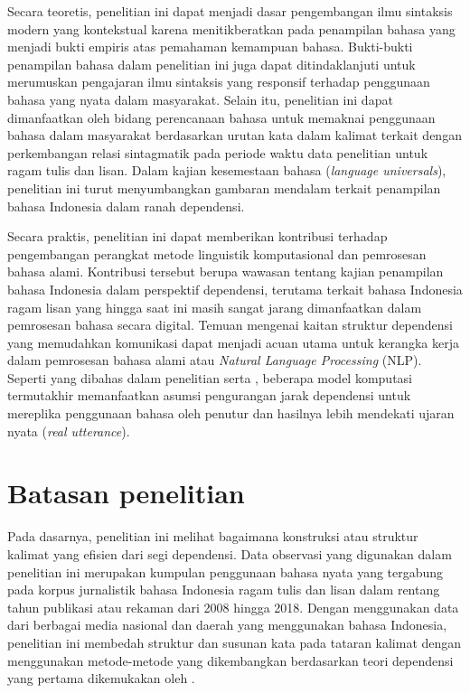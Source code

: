 Secara teoretis, penelitian ini dapat menjadi dasar pengembangan ilmu sintaksis modern yang kontekstual karena menitikberatkan pada penampilan bahasa yang menjadi bukti empiris atas pemahaman kemampuan bahasa. Bukti-bukti penampilan bahasa dalam penelitian ini juga dapat ditindaklanjuti untuk merumuskan pengajaran ilmu sintaksis yang responsif terhadap penggunaan bahasa yang nyata dalam masyarakat. Selain itu, penelitian ini dapat dimanfaatkan oleh bidang perencanaan bahasa untuk memaknai penggunaan bahasa dalam masyarakat berdasarkan urutan kata dalam kalimat terkait dengan perkembangan relasi sintagmatik pada periode waktu data penelitian untuk ragam tulis dan lisan. Dalam kajian kesemestaan bahasa (\textit{language universals}), penelitian ini turut menyumbangkan gambaran mendalam terkait penampilan bahasa Indonesia dalam ranah dependensi.

Secara praktis, penelitian ini dapat memberikan kontribusi terhadap pengembangan perangkat metode linguistik komputasional dan pemrosesan bahasa alami. Kontribusi tersebut berupa wawasan tentang kajian penampilan bahasa Indonesia dalam perspektif dependensi, terutama terkait bahasa Indonesia ragam lisan yang hingga saat ini masih sangat jarang dimanfaatkan dalam pemrosesan bahasa secara digital. Temuan mengenai kaitan struktur dependensi yang memudahkan komunikasi dapat menjadi acuan utama untuk kerangka kerja dalam pemrosesan bahasa alami atau \textit{Natural Language Processing} (NLP). Seperti yang dibahas dalam penelitian \cite{klein2004corpus} serta \cite{smith2006minimum}, beberapa model komputasi termutakhir memanfaatkan asumsi pengurangan jarak dependensi untuk mereplika penggunaan bahasa oleh penutur dan hasilnya lebih mendekati ujaran nyata (\textit{real utterance}).

\section{Batasan penelitian}
Pada dasarnya, penelitian ini melihat bagaimana konstruksi atau struktur kalimat yang efisien dari segi dependensi. Data observasi yang digunakan dalam penelitian ini merupakan kumpulan penggunaan bahasa nyata yang tergabung pada korpus jurnalistik bahasa Indonesia ragam tulis dan lisan dalam rentang tahun publikasi atau rekaman dari 2008 hingga 2018. Dengan menggunakan data dari berbagai media nasional dan daerah yang menggunakan bahasa Indonesia, penelitian ini membedah struktur dan susunan kata pada tataran kalimat dengan menggunakan metode-metode yang dikembangkan berdasarkan teori dependensi yang pertama dikemukakan oleh \cite{tesniere1959elements}. 

